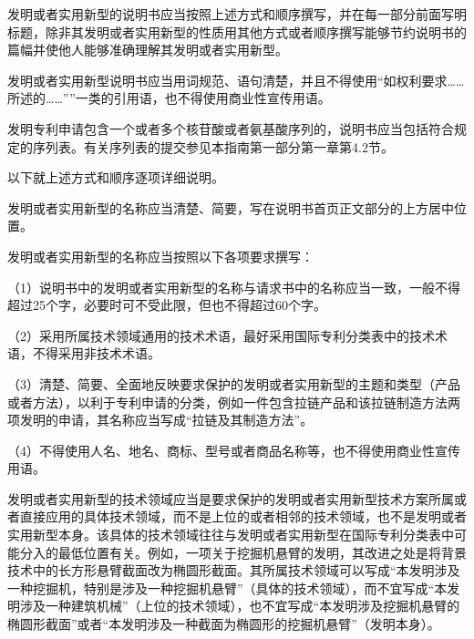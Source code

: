 发明或者实用新型的说明书应当按照上述方式和顺序撰写，并在每一部分前面写明标题，除非其发明或者实用新型的性质用其他方式或者顺序撰写能够节约说明书的篇幅并使他人能够准确理解其发明或者实用新型。

发明或者实用新型说明书应当用词规范、语句清楚，并且不得使用“如权利要求……所述的……””一类的引用语，也不得使用商业性宣传用语。

发明专利申请包含一个或者多个核苷酸或者氨基酸序列的，说明书应当包括符合规定的序列表。有关序列表的提交参见本指南第一部分第一章第4.2节。

以下就上述方式和顺序逐项详细说明。

发明或者实用新型的名称应当清楚、简要，写在说明书首页正文部分的上方居中位置。

发明或者实用新型的名称应当按照以下各项要求撰写：

{\setlength{\parindent}{17.1bp}（1）说明书中的发明或者实用新型的名称与请求书中的名称应当一致，一般不得超过25个字，必要时可不受此限，但也不得超过60个字。\par}

{\setlength{\parindent}{17.1bp}（2）采用所属技术领域通用的技术术语，最好采用国际专利分类表中的技术术语，不得采用非技术术语。\par}

{\setlength{\parindent}{17.1bp}（3）清楚、简要、全面地反映要求保护的发明或者实用新型的主题和类型（产品或者方法），以利于专利申请的分类，例如一件包含拉链产品和该拉链制造方法两项发明的申请，其名称应当写成“拉链及其制造方法”。\par}

{\setlength{\parindent}{17.1bp}（4）不得使用人名、地名、商标、型号或者商品名称等，也不得使用商业性宣传用语。\par}

发明或者实用新型的技术领域应当是要求保护的发明或者实用新型技术方案所属或者直接应用的具体技术领域，而不是上位的或者相邻的技术领域，也不是发明或者实用新型本身。该具体的技术领域往往与发明或者实用新型在国际专利分类表中可能分入的最低位置有关。例如，一项关于挖掘机悬臂的发明，其改进之处是将背景技术中的长方形悬臂截面改为椭圆形截面。其所属技术领域可以写成“本发明涉及一种挖掘机，特别是涉及一种挖掘机悬臂”（具体的技术领域），而不宜写成“本发明涉及一种建筑机械”（上位的技术领域），也不宜写成“本发明涉及挖掘机悬臂的椭圆形截面”或者“本发明涉及一种截面为椭圆形的挖掘机悬臂”（发明本身）。

